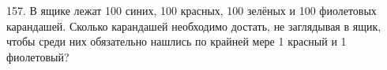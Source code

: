 157. В ящике лежат 100 синих, 100 красных, 100 зелёных и 100 фиолетовых карандашей. Сколько карандашей необходимо достать, не заглядывая в ящик, чтобы среди них обязательно нашлись по крайней мере 1 красный и 1 фиолетовый?\\
